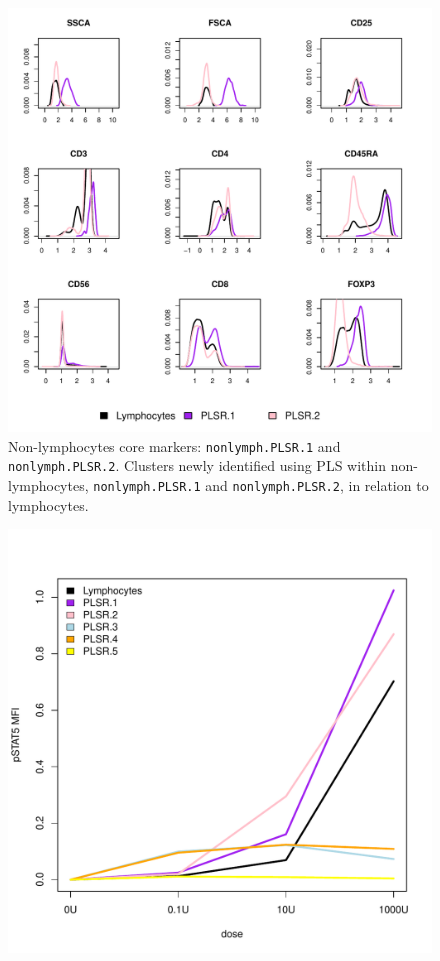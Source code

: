 \begin{figure}
\centering
\begin{minipage}{\textwidth}
\centering
\includegraphics[width=.8\linewidth]{figures/plsr-nonlymphocytes-clusters}
{ Non-lymphocytes core markers: \texttt{nonlymph.PLSR.1} and \texttt{nonlymph.PLSR.2}. }
{
Clusters newly identified using \gls{PLS} within non-lymphocytes, \texttt{nonlymph.PLSR.1} and \texttt{nonlymph.PLSR.2}, in relation to lymphocytes.
} 
\end{minipage}
\begin{minipage}{.5\textwidth}
\includegraphics[width=\linewidth]{figures/plsr-nonlymphocytes-dose-response.pdf}

\end{minipage}
\end{figure}
